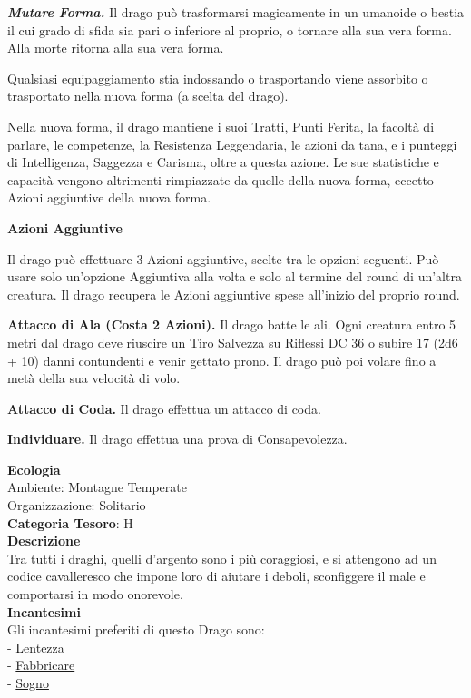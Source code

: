 \begin{multicols}{2}
{\emph{\textbf{Mutare Forma.}} Il drago può trasformarsi magicamente in un umanoide o bestia il cui grado di sfida sia pari o inferiore al proprio, o tornare alla sua vera forma. Alla morte ritorna alla sua vera forma.

Qualsiasi equipaggiamento stia indossando o trasportando viene assorbito o trasportato nella nuova forma (a scelta del drago).

Nella nuova forma, il drago mantiene i suoi Tratti, Punti Ferita, la facoltà di parlare, le competenze, la Resistenza Leggendaria, le azioni da tana, e i punteggi di Intelligenza, Saggezza e Carisma, oltre a questa azione. Le sue statistiche e capacità vengono altrimenti rimpiazzate da quelle della nuova forma, eccetto Azioni aggiuntive della nuova forma.

\textbf{Azioni Aggiuntive}

Il drago può effettuare 3 Azioni aggiuntive, scelte tra le opzioni seguenti. Può usare solo un'opzione Aggiuntiva alla volta e solo al termine del round di un'altra creatura. Il drago recupera le Azioni aggiuntive spese all'inizio del proprio round.

\textbf{Attacco di Ala (Costa 2 Azioni).} Il drago batte le ali. Ogni creatura entro 5 metri dal drago deve riuscire un Tiro Salvezza su Riflessi DC 36 o subire 17 (2d6 + 10) danni contundenti e venir gettato prono. Il drago può poi volare fino a metà della sua velocità di volo.

\textbf{Attacco di Coda.} Il drago effettua un attacco di coda.

\textbf{Individuare.} Il drago effettua una prova di Consapevolezza.

\textbf{Ecologia}\\
Ambiente: Montagne Temperate\\
Organizzazione: Solitario\\
\textbf{Categoria Tesoro}: H\\
\textbf{Descrizione}\\
Tra tutti i draghi, quelli d'argento sono i più coraggiosi, e si attengono ad un codice cavalleresco che impone loro di aiutare i deboli, sconfiggere il male e comportarsi in modo onorevole.\\
\textbf{Incantesimi}\\
Gli incantesimi preferiti di questo Drago sono:\\
- \hyperlink{lentezza}{Lentezza}\\
- \hyperlink{Fabbricare}{Fabbricare}\\
- \hyperlink{Sogno}{Sogno}

}
\end{multicols}
